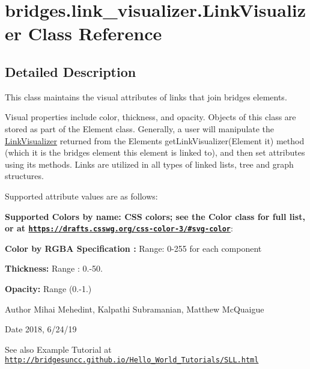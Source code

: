 \hypertarget{classbridges_1_1link__visualizer_1_1_link_visualizer}{}\section{bridges.\+link\+\_\+visualizer.\+Link\+Visualizer Class Reference}
\label{classbridges_1_1link__visualizer_1_1_link_visualizer}


\subsection{Detailed Description}
This class maintains the visual attributes of links that join bridges elements. 

Visual properties include color, thickness, and opacity. Objects of this class are stored as part of the Element class. Generally, a user will manipulate the \mbox{\hyperlink{classbridges_1_1link__visualizer_1_1_link_visualizer}{Link\+Visualizer}} returned from the Element\textquotesingle{}s get\+Link\+Visualizer(\+Element it) method (which it is the bridges element this element is linked to), and then set attributes using its methods. Links are utilized in all types of linked lists, tree and graph structures.

Supported attribute values are as follows\+:

{\bfseries Supported Colors by name\+: C\+SS colors; see the Color class for full list, or at \href{https://drafts.csswg.org/css-color-3/#svg-color}{\tt https\+://drafts.\+csswg.\+org/css-\/color-\/3/\#svg-\/color}}\+: 

{\bfseries  Color by R\+G\+BA Specification \+:} Range\+: 0-\/255 for each component 

{\bfseries  Thickness\+: } Range \+: 0.-\/50.

{\bfseries  Opacity\+: } Range (0.-\/1.) 

\begin{DoxyAuthor}{Author}
Mihai Mehedint, Kalpathi Subramanian, Matthew Mc\+Quaigue
\end{DoxyAuthor}
\begin{DoxyDate}{Date}
2018, 6/24/19
\end{DoxyDate}
\begin{DoxySeeAlso}{See also}
Example Tutorial at ~\newline
 \href{http://bridgesuncc.github.io/Hello_World_Tutorials/SLL.html}{\tt http\+://bridgesuncc.\+github.\+io/\+Hello\+\_\+\+World\+\_\+\+Tutorials/\+S\+L\+L.\+html} 
\end{DoxySeeAlso}
